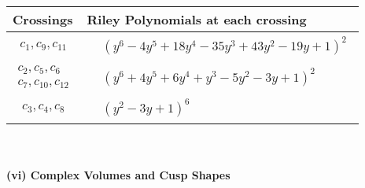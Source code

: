 \documentclass[1p]{elsarticle_modified}
\theoremstyle{definition}
\begin{document}
\begin{tabular}{m{50pt}|m{274pt}}
Crossings & \hspace{64pt}Riley Polynomials at each crossing \\
\hline $$\begin{aligned}c_{1},c_{9},c_{11}\end{aligned}$$&$\begin{aligned}
&(y^6-4 y^5+18 y^4-35 y^3+43 y^2-19 y+1)^2
\end{aligned}$\\
\hline $$\begin{aligned}c_{2},c_{5},c_{6}\\c_{7},c_{10},c_{12}\end{aligned}$$&$\begin{aligned}
&(y^6+4 y^5+6 y^4+y^3-5 y^2-3 y+1)^2
\end{aligned}$\\
\hline $$\begin{aligned}c_{3},c_{4},c_{8}\end{aligned}$$&$\begin{aligned}
&(y^2-3 y+1)^6
\end{aligned}$\\
\hline
\end{tabular}\\~\\
\newpage\flushleft \textbf{(vi) Complex Volumes and Cusp Shapes}
\end{document}
